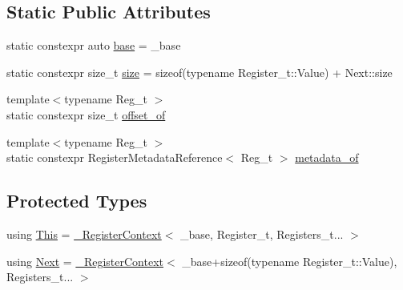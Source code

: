 \subsection*{Static Public Attributes}
\begin{DoxyCompactItemize}
\item 
static constexpr auto \mbox{\hyperlink{classxd_1_1reg_1_1___register_context_3_01__base_00_01_register__t_00_01_registers__t_8_8_8_01_4_a367e99160411017392bd024f9bd9d5d7}{base}} = \+\_\+base
\item 
static constexpr size\+\_\+t \mbox{\hyperlink{classxd_1_1reg_1_1___register_context_3_01__base_00_01_register__t_00_01_registers__t_8_8_8_01_4_a17a791de69c7e93a63846db3f5baf535}{size}} = sizeof(typename Register\+\_\+t\+::\+Value) + Next\+::size
\item 
{\footnotesize template$<$typename Reg\+\_\+t $>$ }\\static constexpr size\+\_\+t \mbox{\hyperlink{classxd_1_1reg_1_1___register_context_3_01__base_00_01_register__t_00_01_registers__t_8_8_8_01_4_a593b94ae447e28ac2449e16eb50c5294}{offset\+\_\+of}}
\item 
{\footnotesize template$<$typename Reg\+\_\+t $>$ }\\static constexpr Register\+Metadata\+Reference$<$ Reg\+\_\+t $>$ \mbox{\hyperlink{classxd_1_1reg_1_1___register_context_3_01__base_00_01_register__t_00_01_registers__t_8_8_8_01_4_a21988ea49e67b7dc84417c2a18149381}{metadata\+\_\+of}}
\end{DoxyCompactItemize}
\subsection*{Protected Types}
\begin{DoxyCompactItemize}
\item 
using \mbox{\hyperlink{classxd_1_1reg_1_1___register_context_3_01__base_00_01_register__t_00_01_registers__t_8_8_8_01_4_ac72bc7f4deacb1a6aa0f286c1b4c01e2}{This}} = \mbox{\hyperlink{classxd_1_1reg_1_1___register_context}{\+\_\+\+Register\+Context}}$<$ \+\_\+base, Register\+\_\+t, Registers\+\_\+t... $>$
\item 
using \mbox{\hyperlink{classxd_1_1reg_1_1___register_context_3_01__base_00_01_register__t_00_01_registers__t_8_8_8_01_4_a4e6d23d9bdc361469e09721b498b9e66}{Next}} = \mbox{\hyperlink{classxd_1_1reg_1_1___register_context}{\+\_\+\+Register\+Context}}$<$ \+\_\+base+sizeof(typename Register\+\_\+t\+::\+Value), Registers\+\_\+t... $>$
\end{DoxyCompactItemize}
